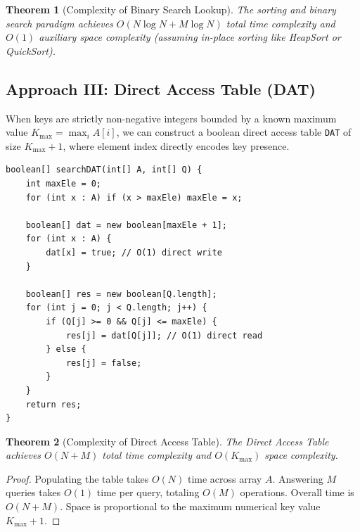 \documentclass[10pt,journal,compsoc,onecolumn]{IEEEtran}
\newtheorem{theorem}{Theorem}
\begin{document}
\begin{theorem}[Complexity of Binary Search Lookup]
The sorting and binary search paradigm achieves $O(N \log N + M \log N)$ total time complexity and $O(1)$ auxiliary space complexity (assuming in-place sorting like HeapSort or QuickSort).
\end{theorem}

\subsection{Approach III: Direct Access Table (DAT)}
When keys are strictly non-negative integers bounded by a known maximum value $K_{\max} = \max_{i} A[i]$, we can construct a boolean direct access table \texttt{DAT} of size $K_{\max} + 1$, where element index directly encodes key presence.

\begin{verbatim}
boolean[] searchDAT(int[] A, int[] Q) {
    int maxEle = 0;
    for (int x : A) if (x > maxEle) maxEle = x;
    
    boolean[] dat = new boolean[maxEle + 1];
    for (int x : A) {
        dat[x] = true; // O(1) direct write
    }
    
    boolean[] res = new boolean[Q.length];
    for (int j = 0; j < Q.length; j++) {
        if (Q[j] >= 0 && Q[j] <= maxEle) {
            res[j] = dat[Q[j]]; // O(1) direct read
        } else {
            res[j] = false;
        }
    }
    return res;
}
\end{verbatim}

\begin{theorem}[Complexity of Direct Access Table]
The Direct Access Table achieves $O(N + M)$ total time complexity and $O(K_{\max})$ space complexity.
\end{theorem}
\begin{proof}
Populating the table takes $O(N)$ time across array $A$. Answering $M$ queries takes $O(1)$ time per query, totaling $O(M)$ operations. Overall time is $O(N + M)$. Space is proportional to the maximum numerical key value $K_{\max} + 1$.
\end{proof}
\end{document}
